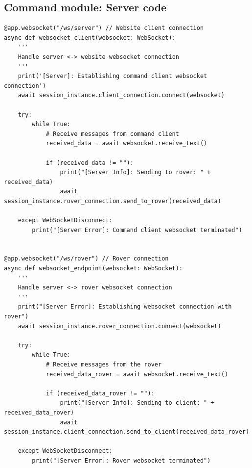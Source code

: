 \documentclass[11pt, a4paper]{article}
\begin{document}
\subsection{Command module: Server code}
\begin{lstlisting}
@app.websocket("/ws/server") // Website client connection
async def websocket_client(websocket: WebSocket):
    '''
    Handle server <-> website websocket connection
    '''
    print('[Server]: Establishing command client websocket connection')
    await session_instance.client_connection.connect(websocket)
    
    try:
        while True:
            # Receive messages from command client 
            received_data = await websocket.receive_text()
                  
            if (received_data != ""):
                print("[Server Info]: Sending to rover: " + received_data)              
                await session_instance.rover_connection.send_to_rover(received_data)
            
    except WebSocketDisconnect:
        print("[Server Error]: Command client websocket terminated")


@app.websocket("/ws/rover") // Rover connection
async def websocket_endpoint(websocket: WebSocket):
    '''
    Handle server <-> rover websocket connection
    '''
    print("[Server Error]: Establishing websocket connection with rover")
    await session_instance.rover_connection.connect(websocket)
    
    try:
        while True:
            # Receive messages from the rover 
            received_data_rover = await websocket.receive_text()
            
            if (received_data_rover != ""):
                print("[Server Info]: Sending to client: " + received_data_rover)  
                await session_instance.client_connection.send_to_client(received_data_rover)
                
    except WebSocketDisconnect:
        print("[Server Error]: Rover websocket terminated")
\end{lstlisting}

\pagebreak
\end{document}
